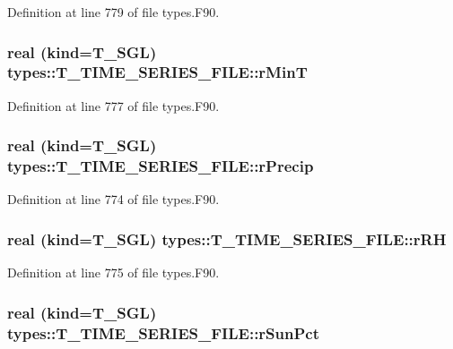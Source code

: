 Definition at line 779 of file types.F90.

\hypertarget{typetypes_1_1_t___t_i_m_e___s_e_r_i_e_s___f_i_l_e_a4703173937768707a74f5d7e84937757}{
\subsubsection[{rMinT}]{\setlength{\rightskip}{0pt plus 5cm}real (kind={\bf T\_\-SGL}) {\bf types::T\_\-TIME\_\-SERIES\_\-FILE::rMinT}}}
\label{typetypes_1_1_t___t_i_m_e___s_e_r_i_e_s___f_i_l_e_a4703173937768707a74f5d7e84937757}


Definition at line 777 of file types.F90.

\hypertarget{typetypes_1_1_t___t_i_m_e___s_e_r_i_e_s___f_i_l_e_a6682746981b5aaff7a9b66f18002786f}{
\subsubsection[{rPrecip}]{\setlength{\rightskip}{0pt plus 5cm}real (kind={\bf T\_\-SGL}) {\bf types::T\_\-TIME\_\-SERIES\_\-FILE::rPrecip}}}
\label{typetypes_1_1_t___t_i_m_e___s_e_r_i_e_s___f_i_l_e_a6682746981b5aaff7a9b66f18002786f}


Definition at line 774 of file types.F90.

\hypertarget{typetypes_1_1_t___t_i_m_e___s_e_r_i_e_s___f_i_l_e_ae25df568b11c1ebaaf9f8318d643fb92}{
\subsubsection[{rRH}]{\setlength{\rightskip}{0pt plus 5cm}real (kind={\bf T\_\-SGL}) {\bf types::T\_\-TIME\_\-SERIES\_\-FILE::rRH}}}
\label{typetypes_1_1_t___t_i_m_e___s_e_r_i_e_s___f_i_l_e_ae25df568b11c1ebaaf9f8318d643fb92}


Definition at line 775 of file types.F90.

\hypertarget{typetypes_1_1_t___t_i_m_e___s_e_r_i_e_s___f_i_l_e_a3eeae8cc5cad67ad5dc017669075ee8a}{
\subsubsection[{rSunPct}]{\setlength{\rightskip}{0pt plus 5cm}real (kind={\bf T\_\-SGL}) {\bf types::T\_\-TIME\_\-SERIES\_\-FILE::rSunPct}}}
\label{typetypes_1_1_t___t_i_m_e___s_e_r_i_e_s___f_i_l_e_a3eeae8cc5cad67ad5dc017669075ee8a}


